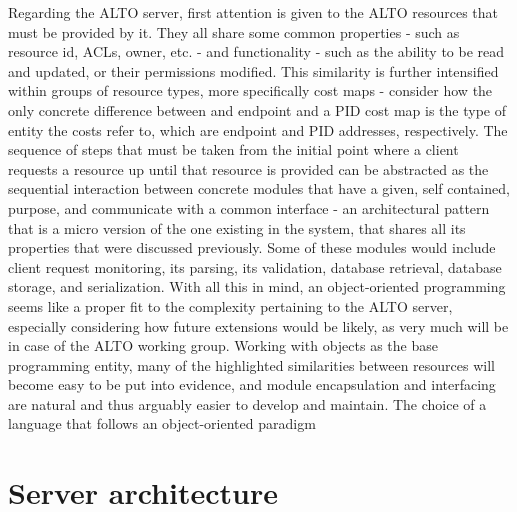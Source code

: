     Regarding the ALTO server, first attention is given to the ALTO resources that must be provided by it.
    They all share some common properties - such as resource id, ACLs, owner, etc. - and functionality - such as the ability to be read and updated, or their permissions modified.
    This similarity is further intensified within groups of resource types, more specifically cost maps - consider how the only concrete difference between and endpoint and a PID cost map is the type of entity the costs refer to, which are endpoint and PID addresses, respectively.
    The sequence of steps that must be taken from the initial point where a client requests a resource up until that resource is provided can be abstracted as the sequential interaction between concrete modules that have a given, self contained, purpose, and communicate with a common interface - an architectural pattern that is a micro version of the one existing in the system, that shares all its properties that were discussed previously.
    Some of these modules would include client request monitoring, its parsing, its validation, database retrieval, database storage, and serialization.
    With all this in mind, an object-oriented programming seems like a proper fit to the complexity pertaining to the ALTO server, especially considering how future extensions would be likely, as very much will be in case of the ALTO working group.
    Working with objects as the base programming entity, many of the highlighted similarities between resources will become easy to be put into evidence, and module encapsulation and interfacing are natural and thus arguably easier to develop and maintain.
    The choice of a language that follows an object-oriented paradigm


\section{Server architecture}

